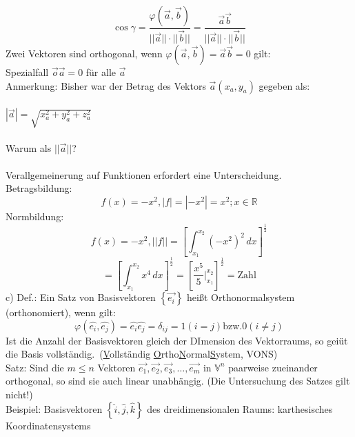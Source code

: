 \documentclass{article}
\begin{document}
\begin{equation*}
    \cos\gamma = \frac{\varphi \left(\vec{a},\vec{b}\right)}{||\vec{a}||\cdot||\vec{b}||}=\frac{\vec{a}\vec{b}}{||\vec{a}||\cdot||\vec{b}||}
\end{equation*}
Zwei Vektoren sind orthogonal, wenn $\varphi\left(\vec{a},\vec{b}\right)=\vec{a}\vec{b}=0$ gilt:\\
Spezialfall $\vec{o}\vec{a}=0$ für alle $\vec{a}$\\
Anmerkung: Bisher war der Betrag des Vektors $\vec{a}\left(x_a,y_a\right)$ gegeben als:\\\\
$|\vec{a}|=\sqrt{x_a^2+y_a^2+z_a^2}$\\\\
Warum als $||\vec{a}||$?\\\\
Verallgemeinerung auf Funktionen erfordert eine Unterscheidung.\\
Betragsbildung:
\begin{equation*}
    f(x)=-x^2, |f|=|-x^2|=x^2; x \in \mathbb{R}
\end{equation*}
Normbildung:
\begin{equation*}
    f(x)=-x^2, ||f||=\left[\int_{x_1}^{x_2} \left(-x^2\right)^2  \,dx \right]^\frac{1}{2}
\end{equation*}
\begin{equation*}
    =\left[\int_{x_1}^{x_2} x^4  \,dx \right]^\frac{1}{2} = \left[\frac{x^5}{5}|_{x_1}^{x_2}\right]^\frac{1}{2}=\mathrm{Zahl}
\end{equation*}
c) Def.: Ein Satz von Basisvektoren $\left\{\vec{e_i}\right\}$ heißt Orthonormalsystem (orthonomiert), wenn gilt:\\
\begin{equation*}
    \varphi\left(\hat{e_i}, \hat{e_j}\right) = \hat{e_i} \hat{e_j} = \delta_{ij} = 1 \left(i = j\right) \mathrm{bzw.} 0 \left(i \neq j\right)
\end{equation*}
Ist die Anzahl der Basisvektoren gleich der DImension des Vektorraums, so geiüt die Basis vollständig.\
(\underline{V}ollständig \underline{O}rtho\underline{N}ormal\underline{S}ystem, VONS)\\
Satz: Sind die $m \leq n$ Vektoren $\vec{e_1},\vec{e_2},\vec{e_3},\dots,\vec{e_m}$ in $\mathbb{V}^n$ paarweise zueinander orthogonal, so sind sie auch linear unabhängig. (Die Untersuchung des Satzes gilt nicht!)\\
Beispiel: Basisvektoren $\left\{\hat{i},\hat{j},\hat{k}\right\}$ des dreidimensionalen Raums: karthesisches Koordinatensystems\\
\end{document}
